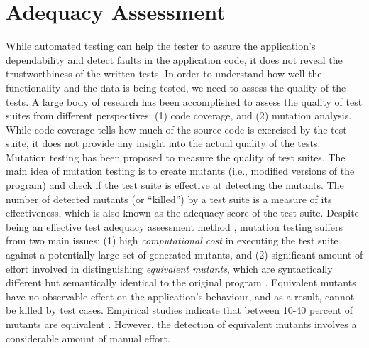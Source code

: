 \section{Adequacy Assessment} \label{Sec:adequacy}
While automated testing can help the tester to assure the application's dependability and detect faults in the application code, it does not reveal the trustworthiness of the written tests.
In order to understand how well the functionality and the data is being tested, we need to assess the quality of the tests.
A large body of research has been accomplished to assess the quality of test suites
from different perspectives: (1) code coverage, and (2) mutation analysis.
While code coverage tells how much of the source code is exercised by the test suite, it does not provide any insight into the actual quality of the tests. Mutation testing has been proposed to measure the quality of test suites. 
The main idea of mutation testing is to create mutants (i.e., modified versions of the program) and check if the test suite is effective at detecting the mutants. The
number of detected mutants (or ``killed'') by a test suite is a measure of its effectiveness, which is also known as the adequacy score of the test suite.
Despite being an effective test adequacy assessment method \cite{andrews:fault-seeding, jia:tse10}, mutation testing suffers from two main issues: (1) high \emph{computational cost} in executing
the test suite against a potentially large set of generated
mutants, and (2) significant amount of effort involved in distinguishing \emph{equivalent mutants}, which are syntactically different but semantically identical to the original
program \cite{budd:acta82}. Equivalent mutants have no observable effect on the application's behaviour, and as a result, cannot
be killed by test cases. Empirical studies indicate that between 10-40 percent of mutants are equivalent \cite{offutt:tvr94, offutt:tvr97}. However, the detection of equivalent mutants involves a considerable amount of manual effort.

